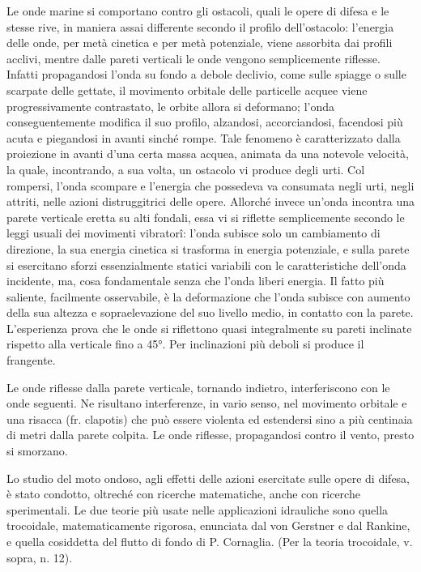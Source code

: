 \documentclass[a4paper]{article}
\begin{document}
Le onde marine si comportano contro gli ostacoli, quali le opere di difesa e le stesse rive, in maniera assai differente secondo il profilo dell'ostacolo: l'energia delle onde, per metà cinetica e per metà potenziale, viene assorbita dai profili acclivi, mentre dalle pareti verticali le onde vengono semplicemente riflesse. Infatti propagandosi l'onda su fondo a debole declivio, come sulle spiagge o sulle scarpate delle gettate, il movimento orbitale delle particelle acquee viene progressivamente contrastato, le orbite allora si deformano; l'onda conseguentemente modifica il suo profilo, alzandosi, accorciandosi, facendosi più acuta e piegandosi in avanti sinché rompe. Tale fenomeno è caratterizzato dalla proiezione in avanti d'una certa massa acquea, animata da una notevole velocità, la quale, incontrando, a sua volta, un ostacolo vi produce degli urti. Col rompersi, l'onda scompare e l'energia che possedeva va consumata negli urti, negli attriti, nelle azioni distruggitrici delle opere. Allorché invece un'onda incontra una parete verticale eretta su alti fondali, essa vi si riflette semplicemente secondo le leggi usuali dei movimenti vibratorî: l'onda subisce solo un cambiamento di direzione, la sua energia cinetica si trasforma in energia potenziale, e sulla parete si esercitano sforzi essenzialmente statici variabili con le caratteristiche dell'onda incidente, ma, cosa fondamentale senza che l'onda liberi energia. Il fatto più saliente, facilmente osservabile, è la deformazione che l'onda subisce con aumento della sua altezza e sopraelevazione del suo livello medio, in contatto con la parete. L'esperienza prova che le onde si riflettono quasi integralmente su pareti inclinate rispetto alla verticale fino a 45°. Per inclinazioni più deboli si produce il frangente.

Le onde riflesse dalla parete verticale, tornando indietro, interferiscono con le onde seguenti. Ne risultano interferenze, in vario senso, nel movimento orbitale e una risacca (fr. clapotis) che può essere violenta ed estendersi sino a più centinaia di metri dalla parete colpita. Le onde riflesse, propagandosi contro il vento, presto si smorzano.

Lo studio del moto ondoso, agli effetti delle azioni esercitate sulle opere di difesa, è stato condotto, oltreché con ricerche matematiche, anche con ricerche sperimentali. Le due teorie più usate nelle applicazioni idrauliche sono quella trocoidale, matematicamente rigorosa, enunciata dal von Gerstner e dal Rankine, e quella cosiddetta del flutto di fondo di P. Cornaglia. (Per la teoria trocoidale, v. sopra, n. 12).
\end{document}

